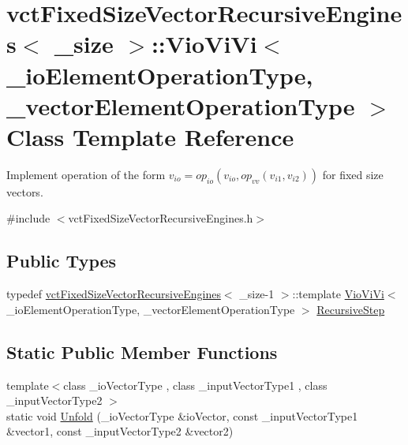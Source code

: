 \hypertarget{classvct_fixed_size_vector_recursive_engines_1_1_vio_vi_vi}{}\section{vct\+Fixed\+Size\+Vector\+Recursive\+Engines$<$ \+\_\+size $>$\+:\+:Vio\+Vi\+Vi$<$ \+\_\+io\+Element\+Operation\+Type, \+\_\+vector\+Element\+Operation\+Type $>$ Class Template Reference}
\label{classvct_fixed_size_vector_recursive_engines_1_1_vio_vi_vi}


Implement operation of the form $v_{io} = op_{io}(v_{io}, op_{vv}(v_{i1}, v_{i2}))$ for fixed size vectors.  




{\ttfamily \#include $<$vct\+Fixed\+Size\+Vector\+Recursive\+Engines.\+h$>$}

\subsection*{Public Types}
\begin{DoxyCompactItemize}
\item 
typedef \hyperlink{classvct_fixed_size_vector_recursive_engines}{vct\+Fixed\+Size\+Vector\+Recursive\+Engines}$<$ \+\_\+size-\/1 $>$\+::template \hyperlink{classvct_fixed_size_vector_recursive_engines_1_1_vio_vi_vi}{Vio\+Vi\+Vi}$<$ \+\_\+io\+Element\+Operation\+Type, \+\_\+vector\+Element\+Operation\+Type $>$ \hyperlink{classvct_fixed_size_vector_recursive_engines_1_1_vio_vi_vi_af67bb1f70825ededcfe0b1cc9b02241b}{Recursive\+Step}
\end{DoxyCompactItemize}
\subsection*{Static Public Member Functions}
\begin{DoxyCompactItemize}
\item 
{\footnotesize template$<$class \+\_\+io\+Vector\+Type , class \+\_\+input\+Vector\+Type1 , class \+\_\+input\+Vector\+Type2 $>$ }\\static void \hyperlink{classvct_fixed_size_vector_recursive_engines_1_1_vio_vi_vi_a351dcd4f36b2105a7777ee839d239c90}{Unfold} (\+\_\+io\+Vector\+Type \&io\+Vector, const \+\_\+input\+Vector\+Type1 \&vector1, const \+\_\+input\+Vector\+Type2 \&vector2)
\end{DoxyCompactItemize}


